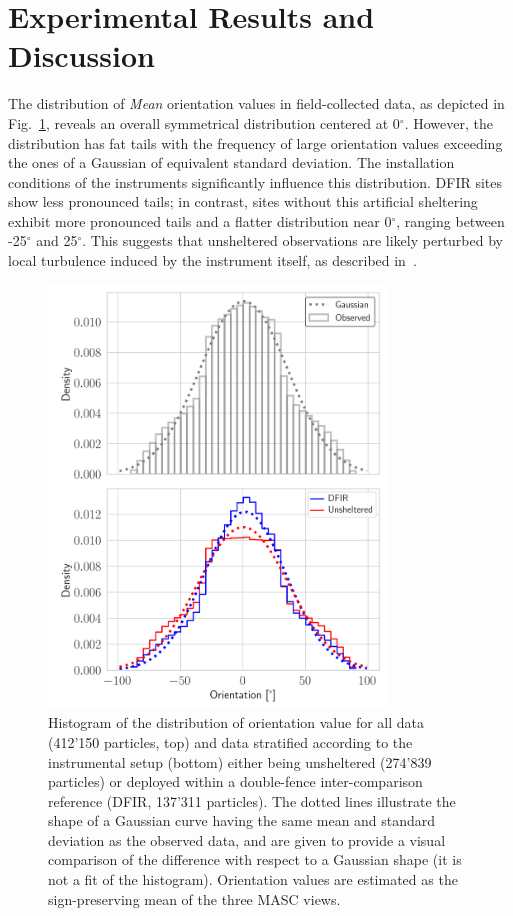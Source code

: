\documentclass[draft]{agujournal2019}
\begin{document}
\section{Experimental Results and Discussion}
The distribution of \textit{Mean} orientation values in field-collected data, as depicted in Fig.~\ref{fig:alldata}, reveals an overall symmetrical distribution centered at 0$^\circ$. However, the distribution has fat tails with the frequency of large orientation values exceeding the ones of a Gaussian of equivalent standard deviation. The installation conditions of the instruments significantly influence this distribution. DFIR sites show less pronounced tails; in contrast, sites without this artificial sheltering exhibit more pronounced tails and a flatter distribution near 0$^\circ$, ranging between -25$^\circ$ and 25$^\circ$. This suggests that unsheltered observations are likely perturbed by local turbulence induced by the instrument itself, as described in~.

\begin{figure}
 \noindent \centering \includegraphics[width=0.8\textwidth]{Fig03.png}
\caption{Histogram of the distribution of orientation value for all data (412'150 particles, top) and data stratified according to the instrumental setup (bottom) either being unsheltered (274'839 particles) or deployed within a double-fence inter-comparison reference (DFIR, 137'311 particles). The dotted lines illustrate the shape of a Gaussian curve having the same mean and standard deviation as the observed data, and are given to provide a visual comparison of the difference with respect to a Gaussian shape (it is not a fit of the histogram). Orientation values are estimated as the sign-preserving mean of the three MASC views.   }
\label{fig:alldata}
\end{figure}
\end{document}

